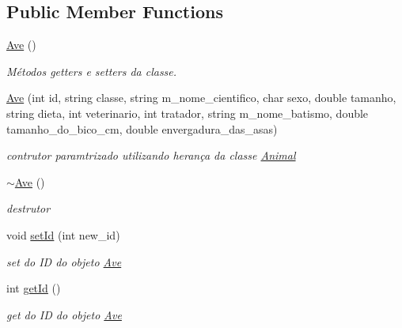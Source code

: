 \subsection*{Public Member Functions}
\begin{DoxyCompactItemize}
\item 
\mbox{\label{class_ave_a31bc97c3258df566381300c8b9abc73a}} 
\mbox{\hyperlink{class_ave_a31bc97c3258df566381300c8b9abc73a}{Ave}} ()
\begin{DoxyCompactList}\small\item\em Métodos getters e setters da classe. \end{DoxyCompactList}\item 
\mbox{\label{class_ave_ade817e535d9214876f785e01c1cd24b6}} 
\mbox{\hyperlink{class_ave_ade817e535d9214876f785e01c1cd24b6}{Ave}} (int id, string classe, string m\+\_\+nome\+\_\+cientifico, char sexo, double tamanho, string dieta, int veterinario, int tratador, string m\+\_\+nome\+\_\+batismo, double tamanho\+\_\+do\+\_\+bico\+\_\+cm, double envergadura\+\_\+das\+\_\+asas)
\begin{DoxyCompactList}\small\item\em contrutor paramtrizado utilizando herança da classe \mbox{\hyperlink{class_animal}{Animal}} \end{DoxyCompactList}\item 
\mbox{\label{class_ave_ad290be8d6fb95f1cfd24b5f55def7741}} 
\mbox{\hyperlink{class_ave_ad290be8d6fb95f1cfd24b5f55def7741}{$\sim$\+Ave}} ()
\begin{DoxyCompactList}\small\item\em destrutor \end{DoxyCompactList}\item 
void \mbox{\hyperlink{class_ave_a2808ae17c4f0d0ab2bbdf34a1d6bc0c1}{set\+Id}} (int new\+\_\+id)
\begin{DoxyCompactList}\small\item\em set do ID do objeto \mbox{\hyperlink{class_ave}{Ave}} \end{DoxyCompactList}\item 
int \mbox{\hyperlink{class_ave_a3d331599c69fe88dfebb48f28c486570}{get\+Id}} ()
\begin{DoxyCompactList}\small\item\em get do ID do objeto \mbox{\hyperlink{class_ave}{Ave}} \end{DoxyCompactList}\item 

\end{DoxyCompactItemize}
